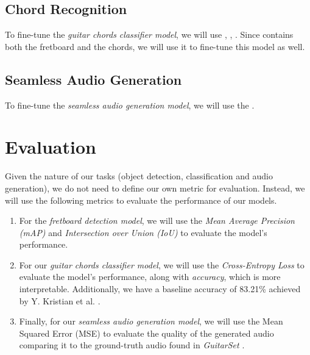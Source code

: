 \documentclass[10pt,twocolumn,letterpaper]{article}
\begin{document}
\subsection{Chord Recognition}
To fine-tune the \emph{guitar chords classifier model}, we will use \cite{guitar-chord-tvon8_dataset}, \cite{guitar-chord-bounding-box_dataset}, \cite{guitar-chord-handshape_dataset}. Since \cite{guitar-chords-daewp_dataset} contains both the fretboard and the chords, we will use it to fine-tune this model as well.

\subsection{Seamless Audio Generation}
To fine-tune the \emph{seamless audio generation model}, we will use the \cite{Xi2018}.

\section{Evaluation}

Given the nature of our tasks (object detection, classification and audio generation), we do not need to define our own metric for evaluation. Instead, we will use the following metrics to evaluate the performance of our models.

\begin{enumerate}[label=\arabic*), itemsep=0.25pt]
    \item For the \emph{fretboard detection model}, we will use the \emph{Mean Average Precision (mAP)} and \emph{Intersection over Union (IoU)} to evaluate the model's performance.
    \item For our \emph{guitar chords classifier model}, we will use the \emph{Cross-Entropy Loss} to evaluate the model's performance, along with \emph{accuracy}, which is more interpretable. Additionally, we have a baseline accuracy of 83.21\% achieved by Y. Kristian et al. \cite{Kristian_Zaman_Tenoyo_Jodhinata_2024}.
    \item Finally, for our \emph{seamless audio generation model}, we will use the Mean Squared Error (MSE) to evaluate the quality of the generated audio comparing it to the ground-truth audio found in \emph{GuitarSet} \cite{Xi2018}.
\end{enumerate}

{\small
    
    
}
\end{document}
